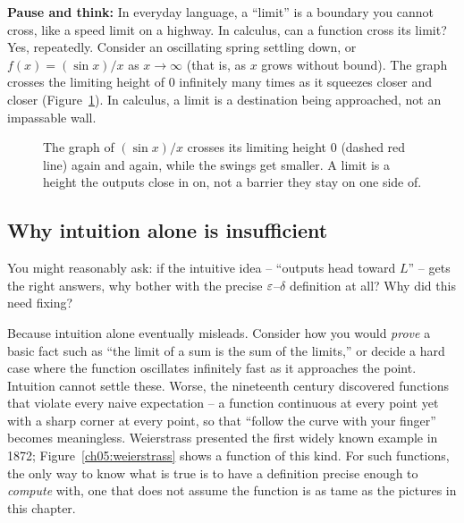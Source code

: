 \begin{recoverybox}
\textbf{Pause and think:} In everyday language, a ``limit'' is a boundary you cannot cross, like a
speed limit on a highway. In calculus, can a function cross its limit? Yes, repeatedly. Consider an
oscillating spring settling down, or $f(x) = (\sin x)/x$ as $x\to\infty$ (that is, as $x$ grows
without bound). The graph crosses the limiting height of $0$ infinitely many times as it squeezes
closer and closer (Figure~\ref{ch05:crossing}). In calculus, a limit is a
destination being approached, not an impassable wall.
\end{recoverybox}

\begin{figure}[htbp]
\centering
{}
\caption{The graph of $(\sin x)/x$ crosses its limiting height $0$ (dashed red line) again
and again, while the swings get smaller. A limit is a height the outputs close in on, not a
barrier they stay on one side of.}
\label{ch05:crossing}
\end{figure}

\subsection{Why intuition alone is insufficient}

You might reasonably ask: if the intuitive idea -- ``outputs head toward $L$'' -- gets the right
answers, why bother with the precise $\varepsilon$--$\delta$ definition at all? Why did this need fixing?

Because intuition alone eventually misleads. Consider how you would
\emph{prove} a basic fact such as ``the limit of a sum is the sum of the limits,'' or decide a
hard case where the function oscillates infinitely fast as it approaches the point.
Intuition cannot settle these. Worse, the nineteenth century discovered
functions that violate every naive expectation -- a function continuous at every point yet with a
sharp corner at every point, so that ``follow the curve with your finger'' becomes meaningless.
Weierstrass presented the first widely known example in 1872; Figure~\ref{ch05:weierstrass}
shows a function of this kind.
For such functions, the only way to know what is true is to have a definition precise enough to
\emph{compute} with, one that does not assume the function is as tame as the
pictures in this chapter.

